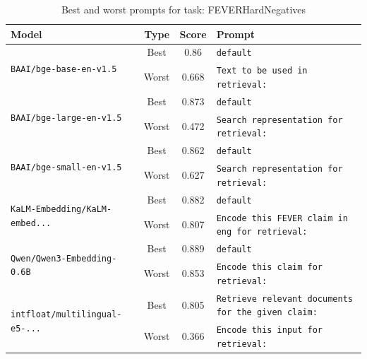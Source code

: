 \begin{table}[t]
\centering
\small
\caption{Best and worst prompts for task: FEVERHardNegatives}
\begin{tabular}{|p{}|c|c|p{}|}
\hline
Model & Type & Score & Prompt \\
\hline
\multirow{2}{=}{\raggedright\texttt{BAAI/\allowbreak bge-\allowbreak base-\allowbreak en-\allowbreak v1.5}} & Best & 0.86 & \texttt{default} \\
\cline{2-4}
& Worst & 0.668 & \texttt{Text to be used in retrieval:} \\
\hline
\multirow{2}{=}{\raggedright\texttt{BAAI/\allowbreak bge-\allowbreak large-\allowbreak en-\allowbreak v1.5}} & Best & 0.873 & \texttt{default} \\
\cline{2-4}
& Worst & 0.472 & \texttt{Search representation for retrieval:} \\
\hline
\multirow{2}{=}{\raggedright\texttt{BAAI/\allowbreak bge-\allowbreak small-\allowbreak en-\allowbreak v1.5}} & Best & 0.862 & \texttt{default} \\
\cline{2-4}
& Worst & 0.627 & \texttt{Search representation for retrieval:} \\
\hline
\multirow{2}{=}{\raggedright\texttt{KaLM-\allowbreak Embedding/\allowbreak KaLM-\allowbreak embed...}} & Best & 0.882 & \texttt{default} \\
\cline{2-4}
& Worst & 0.807 & \texttt{Encode this FEVER claim in eng for retrieval:} \\
\hline
\multirow{2}{=}{\raggedright\texttt{Qwen/\allowbreak Qwen3-\allowbreak Embedding-\allowbreak 0.6B}} & Best & 0.889 & \texttt{default} \\
\cline{2-4}
& Worst & 0.853 & \texttt{Encode this claim for retrieval:} \\
\hline
\multirow{2}{=}{\raggedright\texttt{intfloat/\allowbreak multilingual-\allowbreak e5-\allowbreak ...}} & Best & 0.805 & \texttt{Retrieve relevant documents for the given claim:} \\
\cline{2-4}
& Worst & 0.366 & \texttt{Encode this input for retrieval:} \\
\hline
\end{tabular}
\end{table}

